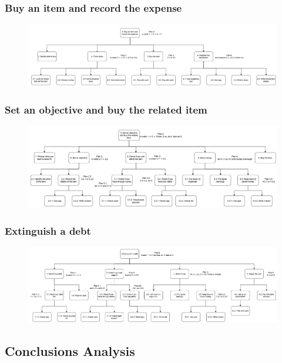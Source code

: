 \documentclass[a4paper,12pt]{article}
\begin{document}
\subsubsection{Buy an item and record the expense}
\begin{figure}[H]
    \centering
    \includegraphics[width=\textwidth]{HTA1.png}
\end{figure}

\subsubsection{Set an objective and buy the related item}
\begin{figure}[H]
    \centering
    \includegraphics[width=\linewidth]{HTA2.png}
\end{figure}

\subsubsection{Extinguish a debt}
\begin{figure}[H]
    \centering
    \includegraphics[width=\linewidth]{HTA3.png}
\end{figure}



\subsection{Conclusions Analysis}
\end{document}
